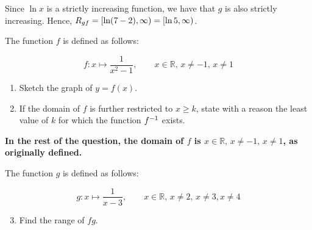 \documentclass{echw}
\begin{document}
            Since $\ln x$ is a strictly increasing function, we have that $g$ is also strictly increasing. Hence, $R_{gf} = [\ln(7 - 2), \infty) = [\ln 5, \infty)$.
            
            \boxt{
                $\ran{gf} = [\ln 5, \infty)$
            }

    \problem{}
        The function $f$ is defined as follows:

        \begin{equation*}
            f \colon x \mapsto \dfrac1{x^2 - 1}, \qquad x \in \mathbb{R}, \, x \neq -1, \, x \neq 1
        \end{equation*}

        \begin{enumerate}
            \item Sketch the graph of $y = f(x)$.
            \item If the domain of $f$ is further restricted to $x \geq k$, state with a reason the least value of $k$ for which the function $f^{-1}$ exists.
        \end{enumerate}

        \noindent \textbf{In the rest of the question, the domain of $f$ is $x \in \mathbb{R}, \, x \neq -1, \, x \neq 1$, as originally defined.}

        \smallskip

        \noindent The function $g$ is defined as follows:

        \begin{equation*}
            g \colon x \mapsto \dfrac1{x-3}, \qquad x \in \mathbb{R}, \, x \neq 2, \, x \neq 3, x \neq 4
        \end{equation*}

        \begin{enumerate}
            \setcounter{enumi}{2}
            \item Find the range of $fg$.
        \end{enumerate}
    
    \solution
\end{document}
